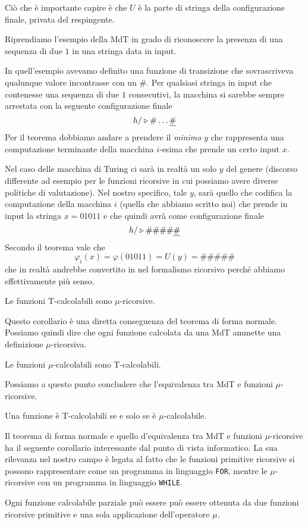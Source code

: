 Ciò che è importante capire è che $U$ è la parte di stringa
della configurazione finale, privata del respingente.

\begin{example}
	Riprendiamo l'esempio della MdT in grado di riconoscere la
	presenza di una sequenza di due $1$ in una stringa data in
	input.

	In quell'esempio avevamo definito una funzione di
	transizione che sovrascriveva qualunque valore incontrasse
	con un $\#$. Per qualsiasi stringa in input che contenesse
	una sequenza di due $1$ consecutivi, la macchina si sarebbe
	sempre arrestata con la seguente configurazione finale
	\[ h / \triangleright \# \dots \underline{\#} \]
	Per il teorema dobbiamo andare a prendere il \emph{minimo}
	$y$ che rappresenta una computazione terminante della
	macchina $i$-esima che prende un certo input $x$.

	Nel caso delle macchina di Turing ci sarà in realtà un solo
	$y$ del genere (discorso differente ad esempio per le
	funzioni ricorsive in cui possiamo avere diverse politiche
	di valutazione). Nel nostro specifico, tale $y$, sarà quello
	che codifica la computazione della macchina $i$ (quella che
	abbiamo scritto noi) che prende in input la stringa
	$x = 01011$ e che quindi avrà come configurazione finale
	\[ h / \triangleright \# \# \# \# \underline{\#} \]
	Secondo il teorema vale che
	\[ \varphi_i (x) = \varphi (01011) = U(y) = \# \# \# \# \# \]
	che in realtà andrebbe convertito in nel formalismo
	ricorsivo perché abbiamo effettivamente più senso.
\end{example}

\begin{corollary}
	Le funzioni T-calcolabili sono $\mu$-ricorsive.
\end{corollary}

Questo corollario è una diretta conseguenza del teorema di
forma normale. Possiamo quindi dire che ogni funzione calcolata
da una MdT ammette una definizione $\mu$-ricorsiva.

\begin{lemma}
	Le funzioni $\mu$-calcolabili sono T-calcolabili.
\end{lemma}

Possiamo a questo punto concludere che l'equivalenza tra MdT
e funzioni $\mu$-ricorsive.

\begin{theorem}
	Una funzione è T-calcolabili se e solo se è
	$\mu$-calcolabile.
\end{theorem}

Il teorema di forma normale e quello d'equivalenza tra MdT e
funzioni $\mu$-ricorsive ha il seguente corollario interessante
dal punto di vista informatico. La sua rilevanza nel nostro
campo è legata al fatto che le funzioni primitive ricorsive
si possono rappresentare come un programma in linguaggio
\verb|FOR|, mentre le $\mu$-ricorsive con un programma in
linguaggio \verb|WHILE|.

\begin{corollary}
	Ogni funzione calcolabile parziale può essere può essere
	ottenuta da due funzioni ricorsive primitive e una sola
	applicazione dell'operatore $\mu$.
\end{corollary}